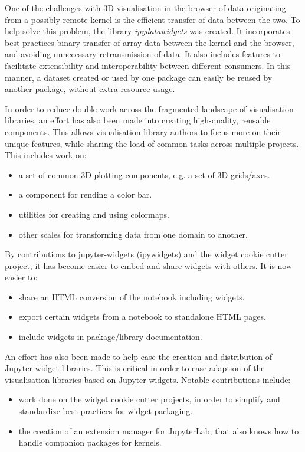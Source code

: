 \documentclass{deliverablereport}
\begin{document}
One of the challenges with 3D visualisation in the browser of data originating from
a possibly remote kernel is the efficient transfer of data between the two. To help
solve this problem, the library \emph{ipydatawidgets} was created. It incorporates
best practices binary transfer of array data between the kernel and the browser,
and avoiding unnecessary retransmission of data. It also includes features to
facilitate extensibility and interoperability between different consumers. In this
manner, a dataset created or used by one package can easily be reused by another package,
without extra resource usage.

In order to reduce double-work across the fragmented landscape of visualisation
libraries, an effort has also been made into creating high-quality, reusable
components. This allows visualisation library authors to focus more on their
unique features, while sharing the load of common tasks across multiple projects.
This includes work on:

\begin{itemize}
\item a set of common 3D plotting components, e.g. a set of 3D grids/axes.
\item a component for rending a color bar.
\item utilities for creating and using colormaps.
\item other scales for transforming data from one domain to another.
\end{itemize}


By contributions to jupyter-widgets (ipywidgets) and the widget cookie cutter project, it has become easier to embed and share widgets with others. It is now easier to:

\begin{itemize}
\item share an HTML conversion of the notebook including widgets.
\item export certain widgets from a notebook to standalone HTML pages.
\item include widgets in package/library documentation.
\end{itemize}

An effort has also been made to help ease the creation and distribution of Jupyter widget libraries. This is critical in order to ease adaption of the visualisation libraries based on Jupyter widgets. Notable contributions include:
\begin{itemize}
\item work done on the widget cookie cutter projects, in order to simplify and standardize best practices for widget packaging.
\item the creation of an extension manager for JupyterLab, that also knows how to handle companion packages for kernels.
\end{itemize}
\end{document}
